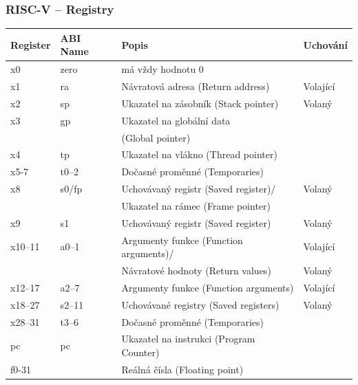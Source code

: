 \begin{frame}[shrink=12]
\frametitle{RISC-V -- Registry}
\begin{tabular}{|l|l|l|l|}\hline
Register & ABI Name & Popis & Uchování \\ \hline
x0 & zero & má vždy hodnotu 0 &  \\\hline
x1 & ra & Návratová adresa (Return address) & Volající \\\hline
x2 & sp & Ukazatel na zásobník (Stack pointer) &  Volaný\\\hline
x3 & gp & Ukazatel na globální data &  \\
   &    & (Global pointer) &  \\\hline
x4 & tp & Ukazatel na vlákno (Thread pointer) &  \\\hline
x5-7 & t0--2 & Dočasné proměnné (Temporaries) &  \\\hline
x8 & s0/fp & Uchovávaný registr (Saved register)/ & Volaný \\
   &       & Ukazatel na rámec (Frame pointer) &  \\\hline
x9 & s1 & Uchovávaný registr (Saved register) &  Volaný \\\hline
x10--11 & a0--1 & Argumenty funkce (Function arguments)/ &  Volající \\
 &  & Návratové hodnoty (Return values) &  Volaný \\\hline
x12--17 & a2--7 & Argumenty funkce (Function arguments) & Volající \\\hline
x18--27 & s2--11 & Uchovávané registry (Saved registers) & Volaný \\\hline
x28--31 & t3--6 & Dočasné proměnné (Temporaries) &  \\\hline
pc & pc & Ukazatel na instrukci (Program Counter) &  \\\hline
f0-31 &  & Reálná čísla (Floating point) &  \\\hline
\end{tabular}
\end{frame}
